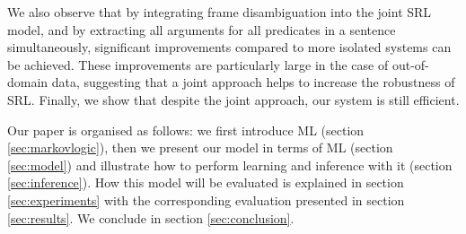 
We also observe that by integrating frame disambiguation into the
joint SRL model, and by extracting all arguments for all predicates in a
sentence simultaneously, significant improvements compared to more isolated systems can be achieved. These improvements are particularly large in
the case of out-of-domain data, suggesting that a joint approach helps
to increase the robustness of SRL.
Finally, we show that despite the joint approach, our
system is still efficient. 

Our paper is organised as follows: we first introduce ML (section
\ref{sec:markovlogic}),
then we present our model in terms of ML (section \ref{sec:model}) and illustrate how to perform learning and inference with it (section \ref{sec:inference}). How this model
will be evaluated is explained in section \ref{sec:experiments} with the corresponding
evaluation presented in section \ref{sec:results}. We conclude in section
\ref{sec:conclusion}.


